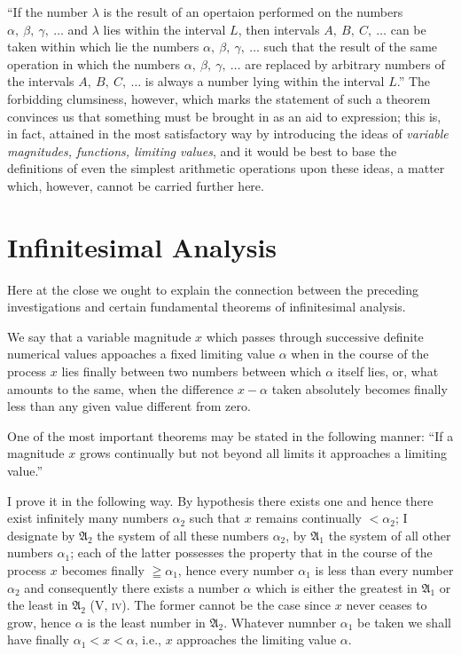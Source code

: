 \documentclass[oneside,12pt]{book}
\newcommand{\iit}[1]{\textit{#1}}
\begin{document}
``If the number $\lambda$ is the result of an opertaion performed on the numbers $\alpha,\ \beta,\ \gamma,\ \dots$ and $\lambda$ lies within the interval $L$, then intervals $A,\ B,\ C,\ \dots$ can be taken within which lie the numbers $\alpha,\ \beta,\ \gamma,\ \dots$ such that the result of the same operation in which the numbers $\alpha,\ \beta,\ \gamma,\ \dots$ are replaced by arbitrary numbers of the intervals $A,\ B,\ C,\ \dots$ is always a number lying within the interval $L$.'' The forbidding clumsiness, however, which marks the statement of such a theorem convinces us that something must be brought in as an aid to expression; this is, in fact, attained in the most satisfactory way by introducing the ideas of \iit{variable magnitudes, functions, limiting values}, and it would be best to base the definitions of even the simplest arithmetic operations upon these ideas, a matter which, however, cannot be carried further here. \par 

\section{Infinitesimal Analysis}
Here at the close we ought to explain the connection between the preceding investigations and certain fundamental theorems of infinitesimal analysis. \par 

We say that a variable magnitude $x$ which passes through successive definite numerical values appoaches a fixed limiting value $\alpha$ when in the course of the process $x$ lies finally between two numbers between which $\alpha$ itself lies, or, what amounts to the same, when the difference $x-\alpha$ taken absolutely becomes finally less than any given value different from zero. \par 

One of the most important theorems may be stated in the following manner: ``If a magnitude $x$ grows continually but not beyond all limits it approaches a limiting value.'' \par 

I prove it in the following way. By hypothesis there exists one and hence there exist infinitely many numbers $\alpha_2$ such that $x$ remains continually $<\alpha_2$; I designate by $\mathfrak{A}_2$ the system of all these numbers $\alpha_2$, by $\mathfrak{A}_1$ the system of all other numbers $\alpha_1$; each of the latter possesses the property that in the course of the process $x$ becomes finally $\geqq\alpha_1$, hence every number $\alpha_1$ is less than every number $\alpha_2$ and consequently there exists a number $\alpha$ which is either the greatest in $\mathfrak{A}_1$ or the least in $\mathfrak{A}_2$ (V, \textsc{iv}). The former cannot be the case since $x$ never ceases to grow, hence $\alpha$ is the least number in $\mathfrak{A}_2$. Whatever numnber $\alpha_1$ be taken we shall have finally $\alpha_1<x<\alpha$, i.e., $x$ approaches the limiting value $\alpha$. \par 
\end{document}
